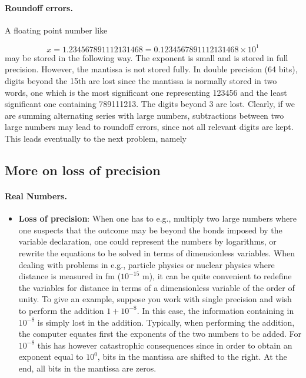 \documentclass[%
oneside,                 %
final,                   %
10pt]{article}
\begin{document}
\paragraph{Roundoff errors.}
A floating point number like

\begin{equation}
   x= 1.234567891112131468 = 0.1234567891112131468\times 10^{1}
\end{equation}
may be stored in the following way. The exponent is  small
and is stored in full precision. However,
the mantissa is not stored fully. In double precision (64 bits), digits
beyond the
15th are lost since the mantissa is normally stored in two words,
one which is the most significant one representing
123456 and the least significant one containing 789111213. The digits
beyond 3 are lost. Clearly, if we are summing alternating series
with large numbers, subtractions between two large numbers may lead
to roundoff errors, since not all relevant digits are kept.
This leads eventually to the next problem, namely

\subsection*{More on loss of precision}


\paragraph{Real Numbers.}

\begin{itemize}
  \item \textbf{Loss of precision}: When one has to e.g., multiply two large numbers where one suspects that the outcome may be beyond the bonds imposed by the variable declaration, one could represent the numbers by logarithms, or rewrite the equations to be solved in terms of dimensionless variables. When dealing with problems in e.g., particle physics or nuclear physics where distance is measured in fm ($10^{-15}$ m), it can be quite convenient to redefine the variables for distance in terms of a dimensionless variable of the order of unity. To give an example, suppose you work with single precision and wish to perform the addition $1+10^{-8}$. In this case, the information containing in $10^{-8}$ is simply lost in the addition. Typically, when performing the addition, the computer equates first the exponents of the two numbers to be added. For $10^{-8}$ this has however catastrophic consequences since in order to obtain an exponent equal to $10^0$, bits in the mantissa are shifted to the right. At the end, all bits in the mantissa are zeros.
\end{itemize}
\end{document}
